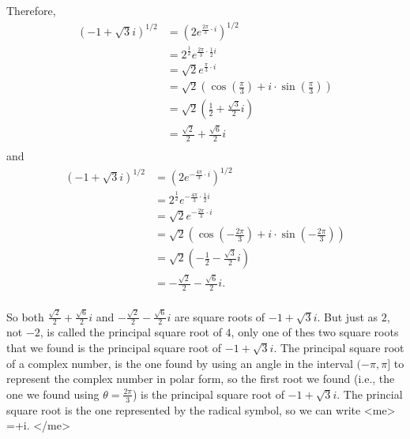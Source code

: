         
          Therefore,
          \begin{align*}
            \left( -1+\sqrt{3}i \right) ^{1/2} &= (2e^{\frac{2\pi}{3}\cdot i})^{1/2} \\
             &=2^{\frac{1}{2}}e^{\frac{2\pi}{3} \cdot \frac{1}{2}i} \\
             &=\sqrt{2}e^{\frac{\pi}{3} \cdot i} \\
             &=\sqrt{2} \left( \cos \left( \frac{\pi}{3} \right)+i\cdot \sin \left( \frac{\pi}{3} \right)\right)\\
             &=\sqrt{2} \left( \frac{1}{2}+\frac{\sqrt{3}}{2}i \right)\\
             &=\frac{\sqrt{2}}{2}+\frac{\sqrt{6}}{2}i \\
          \end{align*}
          and
          \begin{align*}
            \left( -1+\sqrt{3}i \right) ^{1/2} &= \left( 2e^{-\frac{4\pi}{3} \cdot i} \right) ^{1/2} \\
             &=2^{\frac{1}{2}}e^{-\frac{4\pi}{3} \cdot \frac{1}{2}i} \\
             &=\sqrt{2}e^{-\frac{2\pi}{3} \cdot i} \\
             &=\sqrt{2}\left( \cos \left( -\frac{2\pi}{3} \right)+i\cdot \sin \left( -\frac{2\pi}{3} \right)\right)\\
             &=\sqrt{2} \left( -\frac{1}{2}-\frac{\sqrt{3}}{2}i \right)\\
             &=-\frac{\sqrt{2}}{2}-\frac{\sqrt{6}}{2}i. \\
          \end{align*}
        
        
          So both $\frac{\sqrt{2}}{2}+\frac{\sqrt{6}}{2}i$ and $-\frac{\sqrt{2}}{2}-\frac{\sqrt{6}}{2}i$ are square roots of $-1+\sqrt{3}i$. But just as $2$, not $-2$, is called the principal square root of $4$, only one of thes two square roots that we found is the principal square root of $-1+\sqrt{3}i$. The principal square root of a complex number, is the one found by using an angle in the interval $(-\pi,\pi]$ to represent the complex number in polar form, so the first root we found (i.e., the one we found using $\theta=\frac{2\pi}{3}$) is the principal square root of $-1+\sqrt{3}i$. The princial square root is the one represented by the radical symbol, so we can write
          <me>
            =+i.
          </me>
        
